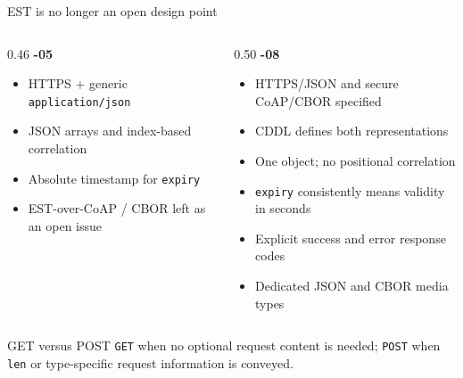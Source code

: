 \documentclass[aspectratio=169,10pt]{beamer}
\begin{document}
\begin{frame}{EST is no longer an open design point}
  \begin{columns}[T,onlytextwidth]
    \begin{column}{0.46\textwidth}
      \textbf{\color{darkgray}-05}
      \begin{itemize}
        \item HTTPS + generic \texttt{application/json}
        \item JSON arrays and index-based correlation
        \item Absolute timestamp for \texttt{expiry}
        \item EST-over-CoAP / CBOR left as an open issue
      \end{itemize}
    \end{column}
    \begin{column}{0.50\textwidth}
      \textbf{\color{ietfblue}-08}
      \begin{itemize}
        \item HTTPS/JSON and secure CoAP/CBOR specified
        \item CDDL defines both representations
        \item One object; no positional correlation
        \item \texttt{expiry} consistently means validity in seconds
        \item Explicit success and error response codes
        \item Dedicated JSON and CBOR media types
      \end{itemize}
    \end{column}
  \end{columns}
  \vspace{0.3cm}
  \begin{block}{GET versus POST}
    \texttt{GET} when no optional request content is needed; \texttt{POST} when
    \texttt{len} or type-specific request information is conveyed.
  \end{block}
\end{frame}
\end{document}
